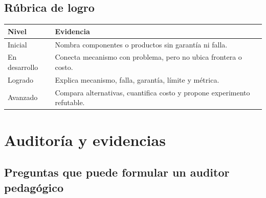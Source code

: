 \documentclass[variant=docente,cover=institutional,mode=screen]{ua-engineering-v6-article}
\begin{document}
\subsection{Rúbrica de logro}

\begin{center}
\begin{tabular}{p{}p{}}
\toprule
Nivel & Evidencia \\
\midrule
Inicial & Nombra componentes o productos sin garantía ni falla. \\
En desarrollo & Conecta mecanismo con problema, pero no ubica frontera o costo. \\
Logrado & Explica mecanismo, falla, garantía, límite y métrica. \\
Avanzado & Compara alternativas, cuantifica costo y propone experimento refutable. \\
\bottomrule
\end{tabular}
\end{center}

\section{Auditoría y evidencias}

\subsection{Preguntas que puede formular un auditor pedagógico}
\end{document}
